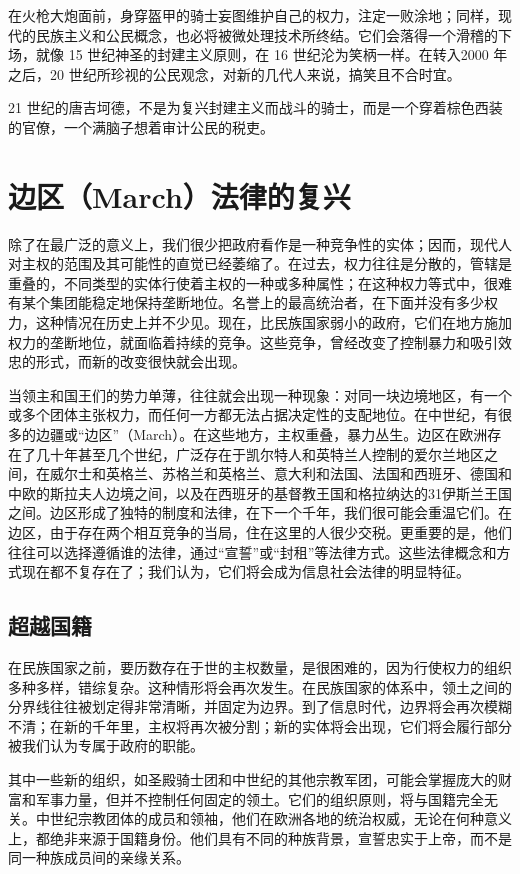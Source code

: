 在火枪大炮面前，身穿盔甲的骑士妄图维护自己的权力，注定一败涂地；同样，现代的民族主义和公民概念，也必将被微处理技术所终结。它们会落得一个滑稽的下场，就像 15 世纪神圣的封建主义原则，在 16 世纪沦为笑柄一样。在转入2000 年之后，20 世纪所珍视的公民观念，对新的几代人来说，搞笑且不合时宜。


21 世纪的唐吉坷德，不是为复兴封建主义而战斗的骑士，而是一个穿着棕色西装的官僚，一个满脑子想着审计公民的税吏。


\section{边区（March）法律的复兴}
除了在最广泛的意义上，我们很少把政府看作是一种竞争性的实体；因而，现代人对主权的范围及其可能性的直觉已经萎缩了。在过去，权力往往是分散的，管辖是重叠的，不同类型的实体行使着主权的一种或多种属性；在这种权力等式中，很难有某个集团能稳定地保持垄断地位。名誉上的最高统治者，在下面并没有多少权力，这种情况在历史上并不少见。现在，比民族国家弱小的政府，它们在地方施加权力的垄断地位，就面临着持续的竞争。这些竞争，曾经改变了控制暴力和吸引效忠的形式，而新的改变很快就会出现。


当领主和国王们的势力单薄，往往就会出现一种现象：对同一块边境地区，有一个或多个团体主张权力，而任何一方都无法占据决定性的支配地位。在中世纪，有很多的边疆或“边区”（March）。在这些地方，主权重叠，暴力丛生。边区在欧洲存在了几十年甚至几个世纪，广泛存在于凯尔特人和英特兰人控制的爱尔兰地区之间，在威尔士和英格兰、苏格兰和英格兰、意大利和法国、法国和西班牙、德国和中欧的斯拉夫人边境之间，以及在西班牙的基督教王国和格拉纳达的31伊斯兰王国之间。边区形成了独特的制度和法律，在下一个千年，我们很可能会重温它们。在边区，由于存在两个相互竞争的当局，住在这里的人很少交税。更重要的是，他们往往可以选择遵循谁的法律，通过“宣誓”或“封租”等法律方式。这些法律概念和方式现在都不复存在了；我们认为，它们将会成为信息社会法律的明显特征。


\subsection{超越国籍}
在民族国家之前，要历数存在于世的主权数量，是很困难的，因为行使权力的组织多种多样，错综复杂。这种情形将会再次发生。在民族国家的体系中，领土之间的分界线往往被划定得非常清晰，并固定为边界。到了信息时代，边界将会再次模糊不清；在新的千年里，主权将再次被分割；新的实体将会出现，它们将会履行部分被我们认为专属于政府的职能。


其中一些新的组织，如圣殿骑士团和中世纪的其他宗教军团，可能会掌握庞大的财富和军事力量，但并不控制任何固定的领土。它们的组织原则，将与国籍完全无关。中世纪宗教团体的成员和领袖，他们在欧洲各地的统治权威，无论在何种意义上，都绝非来源于国籍身份。他们具有不同的种族背景，宣誓忠实于上帝，而不是同一种族成员间的亲缘关系。


